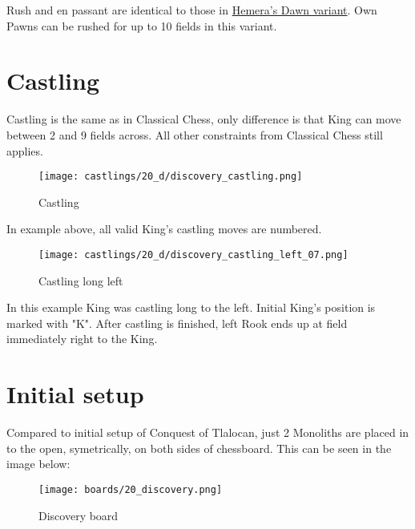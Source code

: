 Rush and en passant are identical to those in \hyperref[fig:14_hemera_s_dawn_en_passant]{Hemera's Dawn variant}.
Own Pawns can be rushed for up to 10 fields in this variant.

\clearpage %

\section*{Castling}

Castling is the same as in Classical Chess, only difference is that King can move between 2 and 9 fields across.
All other constraints from Classical Chess still applies.

\noindent
\begin{figure}[!h]
\texttt{[image: castlings/20\_d/discovery\_castling.png]}
\caption{Castling}
\label{fig:discovery_castling}
\end{figure}

In example above, all valid King's castling moves are numbered.

\noindent
\begin{figure}[!h]
\texttt{[image: castlings/20\_d/discovery\_castling\_left\_07.png]}
\caption{Castling long left}
\label{fig:discovery_castling_left_07}
\end{figure}

In this example King was castling long to the left. Initial King's position is marked with "K".
After castling is finished, left Rook ends up at field immediately right to the King.

\clearpage %

\section*{Initial setup}

Compared to initial setup of Conquest of Tlalocan, just 2 Monoliths are placed in to the open,
symetrically, on both sides of chessboard. This can be seen in the image below:

\noindent
\begin{figure}[h]
\texttt{[image: boards/20\_discovery.png]}
\caption{Discovery board}
\label{fig:20_discovery}
\end{figure}

\clearpage %
